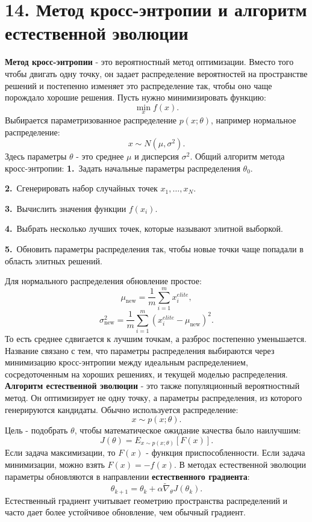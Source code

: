 \documentclass[12pt,a4paper]{article}
\begin{document}
\section{14. Метод кросс-энтропии и алгоритм естественной эволюции}
\textbf{Метод кросс-энтропии} - это вероятностный метод оптимизации. Вместо того чтобы двигать одну точку, он задает распределение вероятностей на пространстве решений и постепенно изменяет это распределение так, чтобы оно чаще порождало хорошие решения.
Пусть нужно минимизировать функцию:
\[
\min_x f(x).
\]
Выбирается параметризованное распределение $p(x;\theta)$, например нормальное распределение:
\[
x\sim N(\mu,\sigma^2).
\]
Здесь параметры $\theta$ - это среднее $\mu$ и дисперсия $\sigma^2$.
Общий алгоритм метода кросс-энтропии:
\noindent\textbf{1.}\ Задать начальные параметры распределения $\theta_0$.\par
\noindent\textbf{2.}\ Сгенерировать набор случайных точек $x_1,\ldots,x_N$.\par
\noindent\textbf{3.}\ Вычислить значения функции $f(x_i)$.\par
\noindent\textbf{4.}\ Выбрать несколько лучших точек, которые называют элитной выборкой.\par
\noindent\textbf{5.}\ Обновить параметры распределения так, чтобы новые точки чаще попадали в область элитных решений.\par
Для нормального распределения обновление простое:
\[
\mu_{\text{new}}=\frac{1}{m}\sum_{i=1}^{m}x_i^{elite},
\]
\[
\sigma_{\text{new}}^2=\frac{1}{m}\sum_{i=1}^{m}(x_i^{elite}-\mu_{\text{new}})^2.
\]
То есть среднее сдвигается к лучшим точкам, а разброс постепенно уменьшается.
Название связано с тем, что параметры распределения выбираются через минимизацию кросс-энтропии между идеальным распределением, сосредоточенным на хороших решениях, и текущей моделью распределения.
\textbf{Алгоритм естественной эволюции} - это также популяционный вероятностный метод. Он оптимизирует не одну точку, а параметры распределения, из которого генерируются кандидаты.
Обычно используется распределение:
\[
x\sim p(x;\theta).
\]
Цель - подобрать $\theta$, чтобы математическое ожидание качества было наилучшим:
\[
J(\theta)=E_{x\sim p(x;\theta)}[F(x)].
\]
Если задача максимизации, то $F(x)$ - функция приспособленности. Если задача минимизации, можно взять $F(x)=-f(x)$.
В методах естественной эволюции параметры обновляются в направлении \textbf{естественного градиента}:
\[
\theta_{k+1}=\theta_k+\alpha \widetilde{\nabla}_\theta J(\theta_k).
\]
Естественный градиент учитывает геометрию пространства распределений и часто дает более устойчивое обновление, чем обычный градиент.
\end{document}
